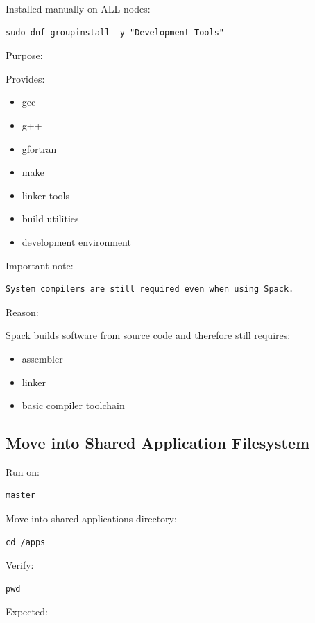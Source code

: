 \documentclass[11pt]{article}
\begin{document}
Installed manually on ALL nodes:

\begin{verbatim}
sudo dnf groupinstall -y "Development Tools"
\end{verbatim}

Purpose:

Provides:

\begin{itemize}
\item gcc
\item g++
\item gfortran
\item make
\item linker tools
\item build utilities
\item development environment
\end{itemize}

Important note:

\begin{verbatim}
System compilers are still required even when using Spack.
\end{verbatim}

Reason:

Spack builds software from source code and therefore still requires:

\begin{itemize}
\item assembler
\item linker
\item basic compiler toolchain
\end{itemize}
\subsection{Move into Shared Application Filesystem}
\label{sec:org4e3b0c1}

Run on:

\begin{verbatim}
master
\end{verbatim}

Move into shared applications directory:

\begin{verbatim}
cd /apps
\end{verbatim}

Verify:

\begin{verbatim}
pwd
\end{verbatim}

Expected:
\end{document}
